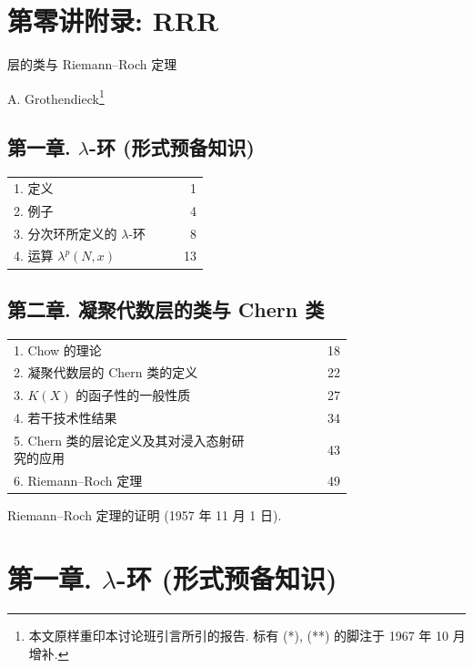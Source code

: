\section*{第零讲附录: RRR}
\begin{center}
{\Large 层的类与 Riemann--Roch 定理}\par
\vspace{0.5em}
A. Grothendieck\footnote{本文原样重印本讨论班引言所引的报告. 标有 (*), (**) 的脚注于 1967 年 10 月增补.}
\end{center}

\subsection*{第一章. $\lambda$-环 (形式预备知识)}
\begin{longtable}{@{}p{0.74\linewidth}r@{}}
1. 定义 & 1\\
2. 例子 & 4\\
3. 分次环所定义的 $\lambda$-环 & 8\\
4. 运算 $\lambda^p(N,x)$ & 13\\
\end{longtable}

\subsection*{第二章. 凝聚代数层的类与 Chern 类}
\begin{longtable}{@{}p{0.74\linewidth}r@{}}
1. Chow 的理论 & 18\\
2. 凝聚代数层的 Chern 类的定义 & 22\\
3. $K(X)$ 的函子性的一般性质 & 27\\
4. 若干技术性结果 & 34\\
5. Chern 类的层论定义及其对浸入态射研究的应用 & 43\\
6. Riemann--Roch 定理 & 49
\end{longtable}

\begin{center}
Riemann--Roch 定理的证明 (1957 年 11 月 1 日).
\end{center}

\section*{第一章. $\lambda$-环 (形式预备知识)}

